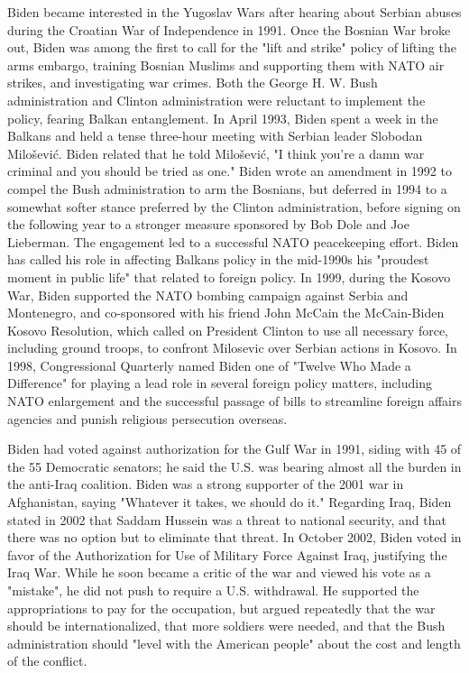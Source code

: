 Biden became interested in the Yugoslav Wars after hearing about Serbian
abuses during the Croatian War of Independence in 1991. Once the Bosnian
War broke out, Biden was among the first to call for the "lift and
strike" policy of lifting the arms embargo, training Bosnian Muslims and
supporting them with NATO air strikes, and investigating war crimes.
Both the George H. W. Bush administration and Clinton administration
were reluctant to implement the policy, fearing Balkan entanglement. In
April 1993, Biden spent a week in the Balkans and held a tense
three-hour meeting with Serbian leader Slobodan Milošević. Biden related
that he told Milošević, "I think you're a damn war criminal and you
should be tried as one." Biden wrote an amendment in 1992 to compel the
Bush administration to arm the Bosnians, but deferred in 1994 to a
somewhat softer stance preferred by the Clinton administration, before
signing on the following year to a stronger measure sponsored by Bob
Dole and Joe Lieberman. The engagement led to a successful NATO
peacekeeping effort. Biden has called his role in affecting Balkans
policy in the mid-1990s his "proudest moment in public life" that
related to foreign policy. In 1999, during the Kosovo War, Biden
supported the NATO bombing campaign against Serbia and Montenegro, and
co-sponsored with his friend John McCain the McCain-Biden Kosovo
Resolution, which called on President Clinton to use all necessary
force, including ground troops, to confront Milosevic over Serbian
actions in Kosovo. In 1998, Congressional Quarterly named Biden one of
"Twelve Who Made a Difference" for playing a lead role in several
foreign policy matters, including NATO enlargement and the successful
passage of bills to streamline foreign affairs agencies and punish
religious persecution overseas.

Biden had voted against authorization for the Gulf War in 1991, siding
with 45 of the 55 Democratic senators; he said the U.S. was bearing
almost all the burden in the anti-Iraq coalition. Biden was a strong
supporter of the 2001 war in Afghanistan, saying "Whatever it takes, we
should do it." Regarding Iraq, Biden stated in 2002 that Saddam Hussein
was a threat to national security, and that there was no option but to
eliminate that threat. In October 2002, Biden voted in favor of the
Authorization for Use of Military Force Against Iraq, justifying the
Iraq War. While he soon became a critic of the war and viewed his vote
as a "mistake", he did not push to require a U.S. withdrawal. He
supported the appropriations to pay for the occupation, but argued
repeatedly that the war should be internationalized, that more soldiers
were needed, and that the Bush administration should "level with the
American people" about the cost and length of the conflict.

